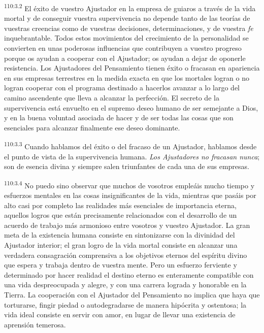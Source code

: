 \par
\textsuperscript{110:3.2} El éxito de vuestro Ajustador en la empresa de guiaros a través de la vida mortal y de conseguir vuestra supervivencia no depende tanto de las teorías de vuestras creencias como de vuestras decisiones, determinaciones, y de vuestra \textit{fe} inquebrantable. Todos estos movimientos del crecimiento de la personalidad se convierten en unas poderosas influencias que contribuyen a vuestro progreso porque os ayudan a cooperar con el Ajustador; os ayudan a dejar de oponerle resistencia. Los Ajustadores del Pensamiento tienen éxito o fracasan en apariencia en sus empresas terrestres en la medida exacta en que los mortales logran o no logran cooperar con el programa destinado a hacerlos avanzar a lo largo del camino ascendente que lleva a alcanzar la perfección. El secreto de la supervivencia está envuelto en el supremo deseo humano de ser semejante a Dios, y en la buena voluntad asociada de hacer y de ser todas las cosas que son esenciales para alcanzar finalmente ese deseo dominante.

\par
\textsuperscript{110:3.3} Cuando hablamos del éxito o del fracaso de un Ajustador, hablamos desde el punto de vista de la supervivencia humana. \textit{Los Ajustadores no fracasan nunca}; son de esencia divina y siempre salen triunfantes de cada una de sus empresas.

\par
\textsuperscript{110:3.4} No puedo sino observar que muchos de vosotros empleáis mucho tiempo y esfuerzos mentales en las cosas insignificantes de la vida, mientras que pasáis por alto casi por completo las realidades más esenciales de importancia eterna, aquellos logros que están precisamente relacionados con el desarrollo de un acuerdo de trabajo más armonioso entre vosotros y vuestro Ajustador. La gran meta de la existencia humana consiste en sintonizarse con la divinidad del Ajustador interior; el gran logro de la vida mortal consiste en alcanzar una verdadera consagración comprensiva a los objetivos eternos del espíritu divino que espera y trabaja dentro de vuestra mente. Pero un esfuerzo ferviente y determinado por hacer realidad el destino eterno es enteramente compatible con una vida despreocupada y alegre, y con una carrera lograda y honorable en la Tierra. La cooperación con el Ajustador del Pensamiento no implica que haya que torturarse, fingir piedad o autodegradarse de manera hipócrita y ostentosa; la vida ideal consiste en servir con amor, en lugar de llevar una existencia de aprensión temerosa.

